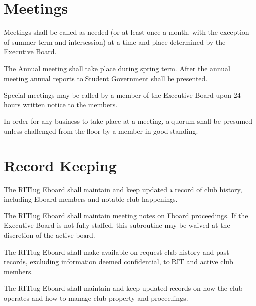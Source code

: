 \section{Meetings}
\begin{subroutines}
\item Meetings shall be called as needed (or at least once a month, with the exception of summer term and intersession) at a time and place determined by the Executive Board.
\item The Annual meeting shall take place during spring term. After the annual meeting annual reports to Student Government shall be presented.
\item Special meetings may be called by a member of the Executive Board upon 24 hours written notice to the members.
\item In order for any business to take place at a meeting, a quorum shall be presumed unless challenged from the floor by a member in good standing.
\end{subroutines}

\section{Record Keeping}
\begin{subroutines}
\item The RITlug Eboard shall maintain and keep updated a record of club history, including Eboard members and notable club happenings.
\item The RITlug Eboard shall maintain meeting notes on Eboard proceedings. If the Executive Board is not fully staffed, this subroutine may be waived at the discretion of the active board.
\item The RITlug Eboard shall make available on request club history and past records, excluding information deemed confidential, to RIT and active club members.
\item The RITlug Eboard shall maintain and keep updated records on how the club operates and how to manage club property and proceedings.
\end{subroutines}

